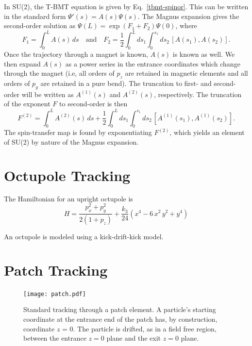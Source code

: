 In SU(2), the T-BMT equation is given by Eq.~\eqref{tbmt-spinor}. This can be written in the
standard form $\Psi'(s)=A(s)\Psi(s)$. The Magnus expansion gives the second-order solution as
$\Psi(L)=\exp(F_1+F_2)\Psi(0)$, where
\begin{equation}
F_1 = \int_0^LA(s)\,ds \quad \mathrm{and} \quad F_2=\frac{1}{2}\int_0^Lds_1\int_0^{s_1}ds_2\,[A(s_1),A(s_2)].
\end{equation}
Once the trajectory through a magnet is known, $A(s)$ is known as well. We then expand $A(s)$ as a
power series in the entrance coordinates which change through the magnet (i.e, all orders of $p_z$
are retained in magnetic elements and all orders of $p_y$ are retained in a pure bend). The
truncation to first- and second-order will be written as $A^{(1)}(s)$ and $A^{(2)}(s)$,
respectively. The truncation of the exponent $F$ to second-order is then
\begin{equation}
F^{(2)}=\int_0^LA^{(2)}(s)\,ds+\frac{1}{2}\int_0^Lds_1\int_0^{s_1}ds_2\,[A^{(1)}(s_1),A^{(1)}(s_2)].
\end{equation}
The spin-transfer map is found by exponentiating $F^{(2)}$, which yields an element of SU(2) by
nature of the Magnus expansion.


\section{Octupole Tracking}
\label{s:octupole.std}

The Hamiltonian for an upright octupole is
\begin{equation}
  H = \frac{p_x^2 + p_y^2}{2 (1 + p_z)} + \frac{k_3}{24} (x^4 - 6 \, x^2 \, y^2 + y^4)
\end{equation}

An octupole is modeled using a kick-drift-kick model.

\section{Patch Tracking}
\label{s:patch.std}

\begin{figure}[tb]
  \centering
  \texttt{[image: patch.pdf]}
  \caption[Standard patch transformation.]
{Standard tracking through a patch element. A particle's starting coordinate at the entrance end of
the patch has, by construction, coordinate $z$ = 0. The particle is drifted, as in a field free
region, between the entrance $z = 0$ plane and the exit $z = 0$ plane.}
  \label{f:patch.track}
\end{figure}

